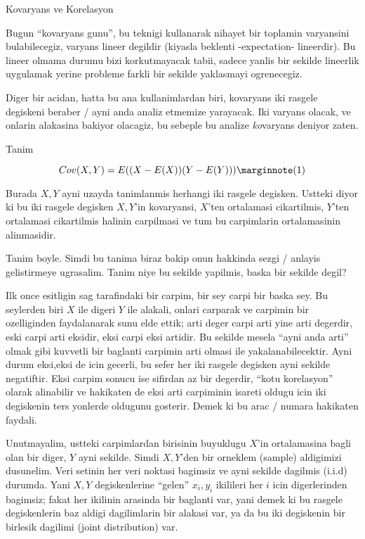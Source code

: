\documentclass[12pt,fleqn]{article}\usepackage{../common}
\begin{document}
Kovaryans ve Korelasyon

Bugun ``kovaryans gunu'', bu teknigi kullanarak nihayet bir toplamin
varyansini bulabilecegiz, varyans lineer degildir (kiyasla beklenti
-expectation- lineerdir). Bu lineer olmama durumu bizi korkutmayacak tabii,
sadece yanlis bir sekilde lineerlik uygulamak yerine probleme farkli bir
sekilde yaklasmayi ogrenecegiz. 

Diger bir acidan, hatta bu ana kullanimlardan biri, kovaryans iki rasgele
degiskeni beraber / ayni anda analiz etmemize yarayacak. Iki varyans
olacak, ve onlarin alakasina bakiyor olacagiz, bu sebeple bu analize {\em
  ko}varyans deniyor zaten. 

Tanim

$$ Cov(X,Y) = E((X-E(X))(Y-E(Y))) \mlabel{1} $$

Burada $X,Y$ ayni uzayda tanimlanmis herhangi iki rasgele degisken. Ustteki
diyor ki bu iki rasgele degisken $X,Y$'in kovaryansi, $X$'ten ortalamasi
cikartilmis, $Y$'ten ortalamasi cikartilmis halinin carpilmasi ve tum bu
carpimlarin ortalamasinin alinmasidir.

Tanim boyle. Simdi bu tanima biraz bakip onun hakkinda sezgi / anlayis
gelistirmeye ugrasalim. Tanim niye bu sekilde yapilmis, baska bir sekilde
degil?

Ilk once esitligin sag tarafindaki bir carpim, bir sey carpi bir baska
sey. Bu seylerden biri $X$ ile digeri $Y$ ile alakali, onlari carparak ve
carpimin bir ozelliginden faydalanarak sunu elde ettik; arti deger carpi
arti yine arti degerdir, eski carpi arti eksidir, eksi carpi eksi
artidir. Bu sekilde mesela ``ayni anda arti'' olmak gibi kuvvetli bir
baglanti carpimin arti olmasi ile yakalanabilecektir. Ayni durum eksi,eksi
de icin gecerli, bu sefer her iki rasgele degisken ayni sekilde
negatiftir. Eksi carpim sonucu ise sifirdan az bir degerdir, ``kotu
korelasyon'' olarak alinabilir ve hakikaten de eksi arti carpiminin isareti
oldugu icin iki degiskenin ters yonlerde oldugunu gosterir. Demek ki bu
arac / numara hakikaten faydali. 

Unutmayalim, ustteki carpimlardan birisinin buyuklugu $X$'in ortalamasina
bagli olan bir diger, $Y$ ayni sekilde. Simdi $X,Y$'den bir orneklem
(sample) aldigimizi dusunelim. Veri setinin her veri noktasi bagimsiz ve
ayni sekilde dagilmis (i.i.d) durumda. Yani $X,Y$ degiskenlerine ``gelen''
$x_i,y_i$ ikilileri her $i$ icin digerlerinden bagimsiz; fakat her ikilinin
arasinda bir baglanti var, yani demek ki bu rasgele degiskenlerin baz
aldigi dagilimlarin bir alakasi var, ya da bu iki degiskenin bir birlesik
dagilimi (joint distribution) var.
\end{document}
